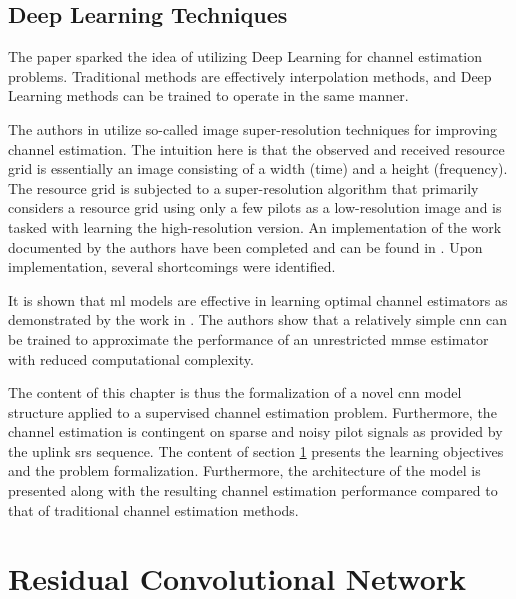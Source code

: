 \subsection{Deep Learning Techniques}
The paper \cite{Soltani2019DeepEstimation} sparked the idea of utilizing Deep Learning for channel estimation problems. Traditional methods are effectively interpolation methods, and Deep Learning methods can be trained to operate in the same manner. 

The authors in \cite{Soltani2019DeepEstimation} utilize so-called image super-resolution techniques for improving channel estimation. The intuition here is that the observed and received resource grid is essentially an image consisting of a width (time) and a height (frequency). The resource grid is subjected to a super-resolution algorithm that primarily considers a resource grid using only a few pilots as a low-resolution image and is tasked with learning the high-resolution version. An implementation of the work documented by the authors have been completed and can be found in \cite{Thrane2020RepositoryLearning}. Upon implementation, several shortcomings were identified. 

It is shown that \gls{ml} models are effective in learning optimal channel estimators as demonstrated by the work in \cite{Neumann2018LearningEstimator}. The authors show that a relatively simple \gls{cnn} can be trained to approximate the performance of an unrestricted \gls{mmse} estimator with reduced computational complexity.  

The content of this chapter is thus the formalization of a novel \gls{cnn} model structure applied to a supervised channel estimation problem. Furthermore, the channel estimation is contingent on sparse and noisy pilot signals as provided by the uplink \gls{srs} sequence. The content of section \ref{sec:cnn_channel_estimator} presents the learning objectives and the problem formalization.  Furthermore, the architecture of the model is presented along with the resulting channel estimation performance compared to that of traditional channel estimation methods.


\section{Residual Convolutional Network}\label{sec:cnn_channel_estimator}

